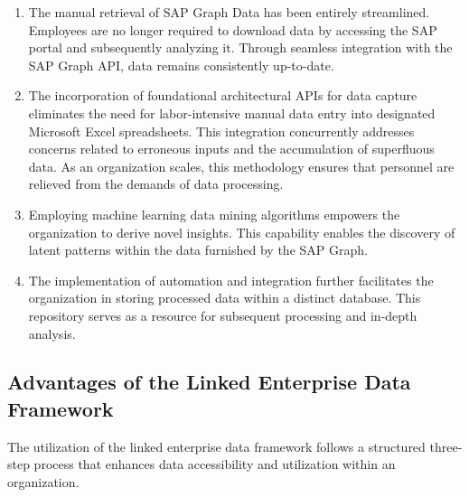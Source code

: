 \documentclass{article}
\begin{document}
\begin{enumerate}
    \item The manual retrieval of SAP Graph Data has been entirely streamlined. Employees are no longer required to download data by accessing the SAP portal and subsequently analyzing it. Through seamless integration with the SAP Graph API, data remains consistently up-to-date.
    
    \item The incorporation of foundational architectural APIs for data capture eliminates the need for labor-intensive manual data entry into designated Microsoft Excel spreadsheets. This integration concurrently addresses concerns related to erroneous inputs and the accumulation of superfluous data. As an organization scales, this methodology ensures that personnel are relieved from the demands of data processing.
    
    \item Employing machine learning data mining algorithms empowers the organization to derive novel insights. This capability enables the discovery of latent patterns within the data furnished by the SAP Graph.
    
    \item The implementation of automation and integration further facilitates the organization in storing processed data within a distinct database. This repository serves as a resource for subsequent processing and in-depth analysis.
\end{enumerate}

\maketitle
\subsection{Advantages of the Linked Enterprise Data Framework}

The utilization of the linked enterprise data framework follows a structured three-step process that enhances data accessibility and utilization within an organization.
\end{document}
